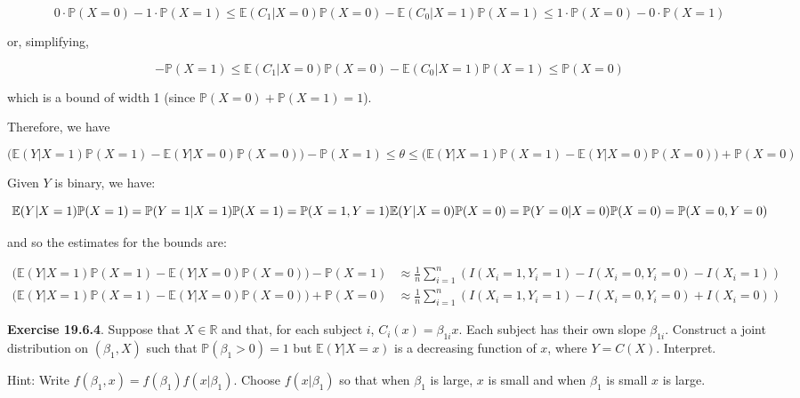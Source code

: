 \[ 0 \cdot \mathbb{P}(X = 0) - 1 \cdot \mathbb{P}(X = 1) \leq \mathbb{E}(C_1 | X = 0) \mathbb{P}(X = 0) - \mathbb{E}(C_0 | X = 1) \mathbb{P}(X = 1) \leq 1 \cdot \mathbb{P}(X = 0) - 0 \cdot \mathbb{P}(X = 1)\]

or, simplifying,

\[ - \mathbb{P}(X = 1) \leq \mathbb{E}(C_1 | X = 0) \mathbb{P}(X = 0) - \mathbb{E}(C_0 | X = 1) \mathbb{P}(X = 1) \leq \mathbb{P}(X = 0) \]

which is a bound of width 1 (since
\(\mathbb{P}(X = 0) + \mathbb{P}(X = 1) = 1\)).

Therefore, we have

\[ \Big( \mathbb{E}(Y | X = 1) \mathbb{P}(X = 1) - \mathbb{E}(Y | X = 0) \mathbb{P}(X = 0) \Big) - \mathbb{P}(X = 1)
 \leq \theta \leq
 \Big( \mathbb{E}(Y | X = 1) \mathbb{P}(X = 1) - \mathbb{E}(Y | X = 0) \mathbb{P}(X = 0) \Big) + \mathbb{P}(X = 0)
\]

Given \(Y\) is binary, we have:

\[ \mathbb{E}(Y | X = 1) \mathbb{P}(X = 1) =  \mathbb{P}(Y = 1 | X = 1) \mathbb{P}(X = 1) =  \mathbb{P}(X = 1, Y = 1) \\
\mathbb{E}(Y | X = 0) \mathbb{P}(X = 0) =  \mathbb{P}(Y = 0 | X = 0) \mathbb{P}(X = 0) =  \mathbb{P}(X = 0, Y = 0) \]

and so the estimates for the bounds are:

\[
\begin{align}
\Big( \mathbb{E}(Y | X = 1) \mathbb{P}(X = 1) - \mathbb{E}(Y | X = 0) \mathbb{P}(X = 0) \Big) - \mathbb{P}(X = 1)
&\approx \frac{1}{n} \sum_{i = 1}^n \left( I(X_i = 1, Y_i = 1) - I(X_i = 0, Y_i = 0) - I(X_i = 1)\right) \\
\Big( \mathbb{E}(Y | X = 1) \mathbb{P}(X = 1) - \mathbb{E}(Y | X = 0) \mathbb{P}(X = 0) \Big) + \mathbb{P}(X = 0)
&\approx \frac{1}{n} \sum_{i = 1}^n \left( I(X_i = 1, Y_i = 1) - I(X_i = 0, Y_i = 0) + I(X_i = 0)\right)
\end{align}
\]

\textbf{Exercise 19.6.4}. Suppose that \(X \in \mathbb{R}\) and that,
for each subject \(i\), \(C_i(x) = \beta_{1i}x\). Each subject has their
own slope \(\beta_{1i}\). Construct a joint distribution on
\((\beta_1, X)\) such that \(\mathbb{P}(\beta_1 > 0) = 1\) but
\(\mathbb{E}(Y | X = x)\) is a decreasing function of \(x\), where
\(Y = C(X)\). Interpret.

Hint: Write \(f(\beta_1, x) = f(\beta_1)f(x | \beta_1)\). Choose
\(f(x | \beta_1)\) so that when \(\beta_1\) is large, \(x\) is small and
when \(\beta_1\) is small \(x\) is large.

